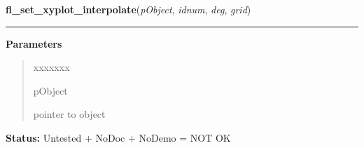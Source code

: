     \label{xformslib:library:fl_set_xyplot_interpolate}

    \vspace{0.5ex}

\hspace{.8\funcindent}\begin{boxedminipage}{\funcwidth}

    \raggedright \textbf{fl\_set\_xyplot\_interpolate}(\textit{pObject}, \textit{idnum}, \textit{deg}, \textit{grid})

    \vspace{-1.5ex}

    \rule{\textwidth}{0.5\fboxrule}
\setlength{\parskip}{2ex}
\setlength{\parskip}{1ex}
      \textbf{Parameters}
      \vspace{-1ex}

      \begin{quote}
        \begin{Ventry}{xxxxxxx}

          \item[pObject]

          pointer to object

        \end{Ventry}

      \end{quote}

\textbf{Status:} Untested + NoDoc + NoDemo = NOT OK



    \end{boxedminipage}

    \label{xformslib:library:fl_set_xyplot_inspect}

    \vspace{0.5ex}

